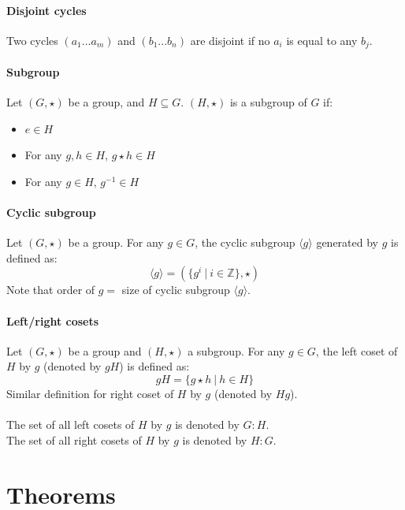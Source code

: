 \documentclass{article}
\newcommand{\Z}{\mathbb{Z}}
\begin{document}
\paragraph{Disjoint cycles}
Two cycles $ (a_{1}...a_{m}) $ and $ (b_{1}...b_{n}) $ are disjoint if no $ a_{i} $ is equal to any $ b_{j} $.
\paragraph{Subgroup}
Let $ (G, \star) $ be a group, and $ H \subseteq G $. $ (H, \star) $ is a subgroup of $ G $ if:
\begin{itemize}
\item $ e \in H $
\item For any $ g, h \in H $,  $ g \star h \in H $
\item For any $ g \in H $, $ g^{-1} \in H $
\end{itemize}
\paragraph{Cyclic subgroup}
Let $ (G, \star) $ be a group. For any $ g \in G $, the cyclic subgroup $ \langle g \rangle $ generated by $ g $ is defined as:
\begin{equation}
\langle g \rangle = (\{g^{i} \ | \ i \in \Z \}, \star)
\end{equation}
Note that order of $ g  = $  size of cyclic subgroup $ \langle g \rangle $.
\paragraph{Left/right cosets}
Let $ (G, \star) $ be a group and $ (H, \star) $ a subgroup. For any $ g \in G $, the left coset of $ H $ by $ g $ (denoted by $ gH $) is defined as:
\begin{equation}
gH = \{g \star h \ | \ h \in H \}
\end{equation}
Similar definition for right coset of $ H $ by $ g $ (denoted by $ Hg $).
\\\\
The set of all left cosets of $ H $ by $ g $ is denoted by $ G : H $.
\\
The set of all right cosets of $ H $ by $ g $ is denoted by $ H : G $.

\section{Theorems}
\end{document}
